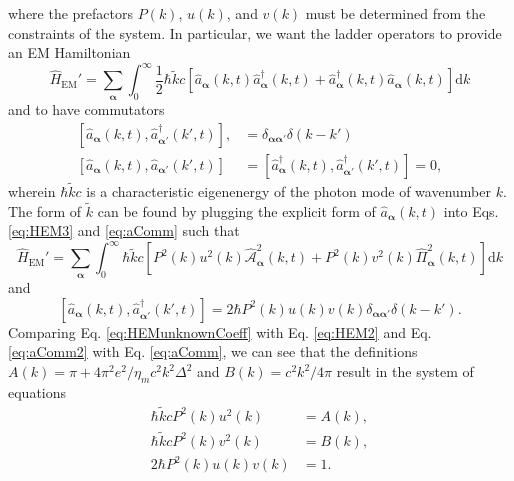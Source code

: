 \documentclass{article}
\begin{document}
where the prefactors $P(k)$, $u(k)$, and $v(k)$ must be determined from the constraints of the system. In particular, we want the ladder operators to provide an EM Hamiltonian
\begin{equation}\label{eq:HEM3}
\hat{H}_{\mathrm{EM}}' = \sum_{\bm{\alpha}}\int_0^\infty\frac{1}{2}\hbar\tilde{k}c\left[\hat{a}_{\bm{\alpha}}(k,t)\hat{a}_{\bm{\alpha}}^\dagger(k,t) + \hat{a}_{\bm{\alpha}}^\dagger(k,t)\hat{a}_{\bm{\alpha}}(k,t)\right]\mathrm{d}k
\end{equation}
and to have commutators
\begin{equation}\label{eq:aComm}
\begin{split}
[\hat{a}_{\bm{\alpha}}(k,t),\hat{a}_{\bm{\alpha}'}^\dagger(k',t)], &= \delta_{\bm{\alpha}\bm{\alpha}'}\delta(k - k')\\
[\hat{a}_{\bm{\alpha}}(k,t),\hat{a}_{\bm{\alpha}'}(k',t)] &= [\hat{a}_{\bm{\alpha}}^\dagger(k,t),\hat{a}_{\bm{\alpha}'}^\dagger(k',t)] = 0,
\end{split}
\end{equation}
wherein $\hbar\tilde{k}c$ is a characteristic eigenenergy of the photon mode of wavenumber $k$. The form of $\tilde{k}$ can be found by plugging the explicit form of $\hat{a}_{\bm{\alpha}}(k,t)$ into Eqs. \eqref{eq:HEM3} and \eqref{eq:aComm} such that
\begin{equation}\label{eq:HEMunknownCoeff}
\hat{H}_\mathrm{EM}' = \sum_{\bm{\alpha}}\int_0^\infty\hbar\tilde{k}c\left[P^2(k)u^2(k)\hat{\mathcal{A}}^2_{\bm{\alpha}}(k,t) + P^2(k)v^2(k)\hat{\mathit{\Pi}}_{\bm{\alpha}}^2(k,t)\right]\mathrm{d}k
\end{equation}
and
\begin{equation}\label{eq:aComm2}
[\hat{a}_{\bm{\alpha}}(k,t),\hat{a}_{\bm{\alpha}'}^\dagger(k',t)] = 2\hbar P^2(k)u(k)v(k)\delta_{\bm{\alpha}\bm{\alpha}'}\delta(k - k').
\end{equation}
Comparing Eq. \eqref{eq:HEMunknownCoeff} with Eq. \eqref{eq:HEM2} and Eq. \eqref{eq:aComm2} with Eq. \eqref{eq:aComm}, we can see that the definitions $A(k) = \pi + 4\pi^2e^2/\eta_mc^2k^2\Delta^2$ and $B(k) = c^2k^2/4\pi$ result in the system of equations
\begin{equation}\label{eq:prefactorSystem}
\begin{split}
\hbar\tilde{k}cP^2(k)u^2(k) &= A(k),\\
\hbar\tilde{k}cP^2(k)v^2(k) &= B(k),\\
2\hbar P^2(k)u(k)v(k) &= 1.
\end{split}
\end{equation}
\end{document}
